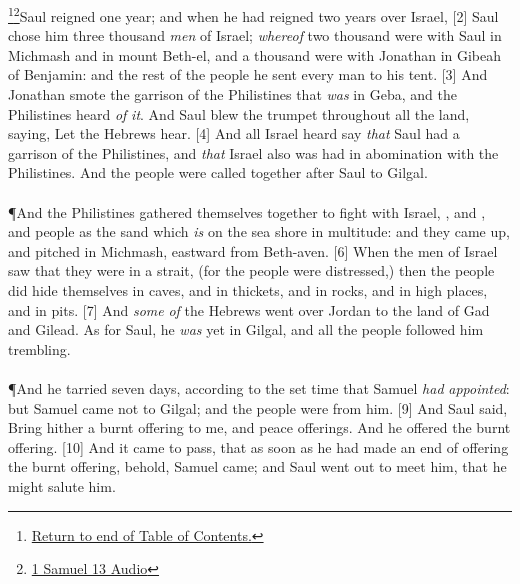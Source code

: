 \footnote{\textcolor[cmyk]{0.99998,1,0,0}{\hyperlink{TOC}{Return to end of Table of Contents.}}}\footnote{\href{https://audiobible.com/bible/1_samuel_13.html}{\textcolor[cmyk]{0.99998,1,0,0}{1 Samuel 13 Audio}}}\textcolor[cmyk]{0.99998,1,0,0}{Saul reigned one year; and when he had reigned two years over Israel,}
[2] \textcolor[cmyk]{0.99998,1,0,0}{Saul chose him three thousand \emph{men} of Israel; \emph{whereof} two thousand were with Saul in Michmash and in mount Beth-el, and a thousand were with Jonathan in Gibeah of Benjamin: and the rest of the people he sent every man to his tent.}
[3] \textcolor[cmyk]{0.99998,1,0,0}{And Jonathan smote the garrison of the Philistines that \emph{was} in Geba, and the Philistines heard \emph{of} \emph{it}. And Saul blew the trumpet throughout all the land, saying, Let the Hebrews hear.}
[4] \textcolor[cmyk]{0.99998,1,0,0}{And all Israel heard say \emph{that} Saul had  a garrison of the Philistines, and \emph{that} Israel also was had in abomination with the Philistines. And the people were called together after Saul to Gilgal.}\\
\\
\P \textcolor[cmyk]{0.99998,1,0,0}{And the Philistines gathered themselves together to fight with Israel,  , and , and people as the sand which \emph{is} on the sea shore in multitude: and they came up, and pitched in Michmash, eastward from Beth-aven.}
[6] \textcolor[cmyk]{0.99998,1,0,0}{When the men of Israel saw that they were in a strait, (for the people were distressed,) then the people did hide themselves in caves, and in thickets, and in rocks, and in high places, and in pits.}
[7] \textcolor[cmyk]{0.99998,1,0,0}{And \emph{some} \emph{of} the Hebrews went over Jordan to the land of Gad and Gilead. As for Saul, he \emph{was} yet in Gilgal, and all the people followed him trembling.}\\
\\
\P \textcolor[cmyk]{0.99998,1,0,0}{And he tarried seven days, according to the set time that Samuel \emph{had} \emph{appointed}: but Samuel came not to Gilgal; and the people were  from him.}
[9] \textcolor[cmyk]{0.99998,1,0,0}{And Saul said, Bring hither a burnt offering to me, and peace offerings. And he offered the burnt offering.}
[10] \textcolor[cmyk]{0.99998,1,0,0}{And it came to pass, that as soon as he had made an end of offering the burnt offering, behold, Samuel came; and Saul went out to meet him, that he might salute him.}\\
